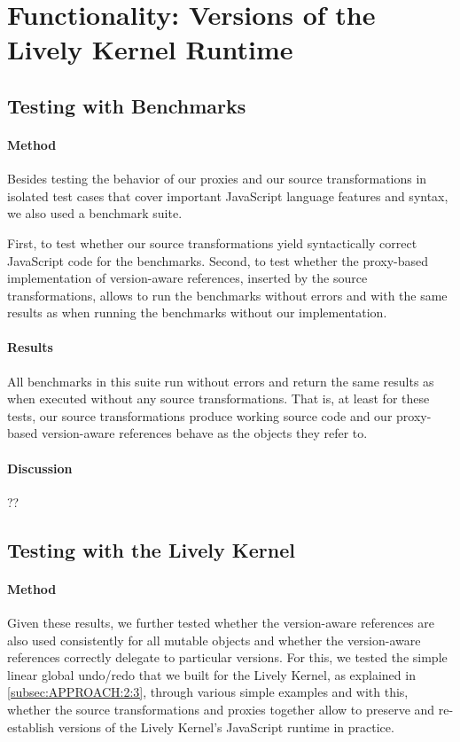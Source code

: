 \section{Functionality: Versions of the Lively Kernel Runtime} \label{sec:DISCUSSION:1}


\subsection{Testing with Benchmarks}

\paragraph{Method}
Besides testing the behavior of our proxies and our source transformations in isolated test cases that cover important JavaScript language features and syntax, we also used a benchmark suite.

First, to test whether our source transformations yield syntactically correct JavaScript code for the benchmarks.
Second, to test whether the proxy-based implementation of version-aware references, inserted by the source transformations, allows to run the benchmarks without errors and with the same results as when running the benchmarks without our implementation.


\paragraph{Results}
All benchmarks in this suite run without errors and return the same results as when executed without any source transformations.
That is, at least for these tests, our source transformations produce working source code and our proxy-based version-aware references behave as the objects they refer to.

\paragraph{Discussion}
??


\subsection{Testing with the Lively Kernel}

\paragraph{Method}
Given these results, we further tested whether the version-aware references are also used consistently for all mutable objects and whether the version-aware references correctly delegate to particular versions.
For this, we tested the simple linear global undo/redo that we built for the Lively Kernel, as explained in \ref{subsec:APPROACH:2:3}, through various simple examples and with this, whether the source transformations and proxies together allow to preserve and re-establish versions of the Lively Kernel's JavaScript runtime in practice.


